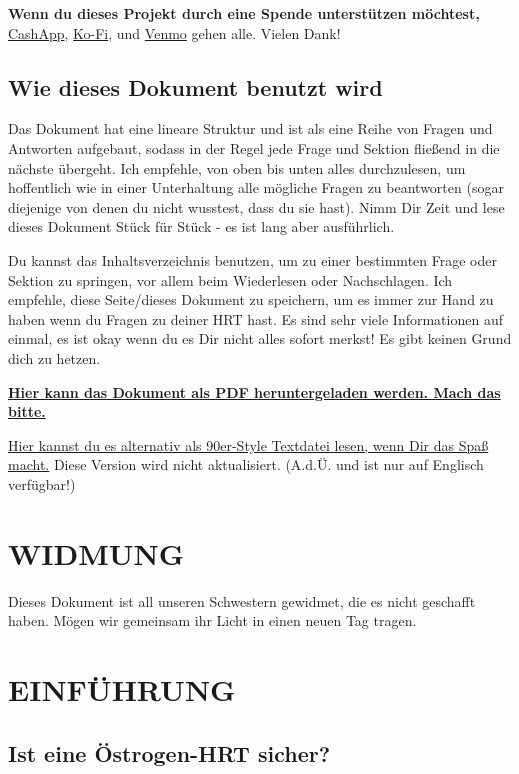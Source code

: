\documentclass{article}
\begin{document}
\textbf{Wenn du dieses Projekt durch eine Spende unterstützen möchtest,} \href{https://cash.app/Katitties}{CashApp}, \href{https://ko-fi.com/katitties}{Ko-Fi}, und \href{https://account.venmo.com/u/katitties}{Venmo} gehen alle. Vielen Dank!

\subsection*{Wie dieses Dokument benutzt wird}

Das Dokument hat eine lineare Struktur und ist als eine Reihe von Fragen und Antworten aufgebaut, sodass in der Regel jede Frage und Sektion fließend in die nächste übergeht. Ich empfehle, von oben bis unten alles durchzulesen, um hoffentlich wie in einer Unterhaltung alle mögliche Fragen zu beantworten (sogar diejenige von denen du nicht wusstest, dass du sie hast). Nimm Dir Zeit und lese dieses Dokument Stück für Stück - es ist lang aber ausführlich.

Du kannst das Inhaltsverzeichnis benutzen, um zu einer bestimmten Frage oder Sektion zu springen, vor allem beim Wiederlesen oder Nachschlagen. Ich empfehle, diese Seite/dieses Dokument zu speichern, um es immer zur Hand zu haben wenn du Fragen zu deiner HRT hast. Es sind sehr viele Informationen auf einmal, es ist okay wenn du es  Dir nicht alles sofort merkst! Es gibt keinen Grund dich zu hetzen.

\noindent\textbf{\href{PDF_LINK}{Hier kann das Dokument als PDF heruntergeladen werden. Mach das bitte.}}

\noindent\href{https://pghrt.diy/pghrtgretchensversion.txt}{Hier kannst du es alternativ als 90er-Style Textdatei lesen, wenn Dir das Spaß macht.} Diese Version wird nicht aktualisiert. (A.d.Ü. und ist nur auf Englisch verfügbar!)

\section*{WIDMUNG}

Dieses Dokument ist all unseren Schwestern gewidmet, die es nicht geschafft haben. Mögen wir gemeinsam ihr Licht in einen neuen Tag tragen.


\section{EINFÜHRUNG}

\subsection{Ist eine Östrogen-HRT sicher?}
\end{document}
